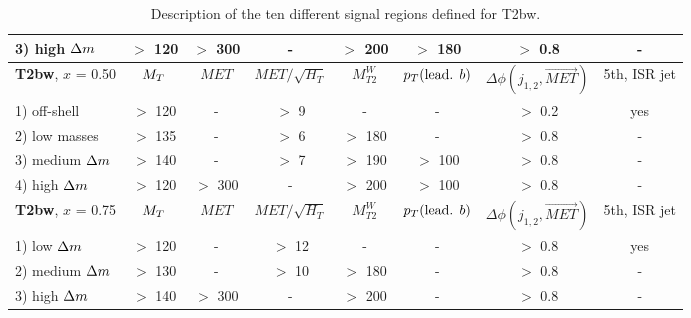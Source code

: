 \begin{table}[!ht]
{\begin{center}
\begin{tabular}{|l|ccccccc|}
                    3) high   $\Delta m$ & $>$ 120   & $>$ 300  &     -           &  $>$ 200   & $>$ 180               &  $>$ 0.8      & -             \\
                    \hline
                      \textbf{T2bw}, $x$ = 0.50       & $M_T$     & $MET$    & $MET/\sqrt{H_T}$ & $M_{T2}^W$ & $p_T(\text{lead. }b)$ & $\Delta\phi(j_{1,2},\vec{MET})$ & 5th, ISR jet  \\
                        \hline
                    1) off-shell       &  $>$ 120  &   -      &  $>$  9         &    -       & -                     &  $>$ 0.2      & yes           \\
                    2) low masses      &  $>$ 135  &   -      &  $>$  6         & $>$ 180    & -                     &  $>$ 0.8      & -             \\
                    3) medium $\Delta m$ &  $>$ 140  &   -      &  $>$  7         & $>$ 190    & $>$ 100               &  $>$ 0.8      & -             \\
                    4) high   $\Delta m$ &  $>$ 120  & $>$ 300  &   -             & $>$ 200    & $>$ 100               &  $>$ 0.8      & -             \\
                        \hline
                        \textbf{T2bw}, $x$ = 0.75     & $M_T$     & $MET$    & $MET/\sqrt{H_T}$ & $M_{T2}^W$ & $p_T(\text{lead. }b)$ & $\Delta\phi(j_{1,2},\vec{MET})$ & 5th, ISR jet  \\
                        \hline
                    1) low    $\Delta m$ &  $>$ 120  &   -      &  $>$  12        &     -      &      -                &  $>$ 0.8      & yes           \\
                    2) medium $\Delta m$ &  $>$ 130  &   -      &  $>$  10        &  $>$ 180   &      -                &  $>$ 0.8      & -             \\
                    3) high   $\Delta m$ &  $>$ 140  & $>$ 300  &    -            &  $>$ 200   &      -                &  $>$ 0.8      & -             \\
                        \hline                                                 
                    \end{tabular}
            \caption{Description of the ten different signal regions defined for T2bw. \label{tab:cutAndCountCuts}} 
            \end{center}}
            \end{table}


